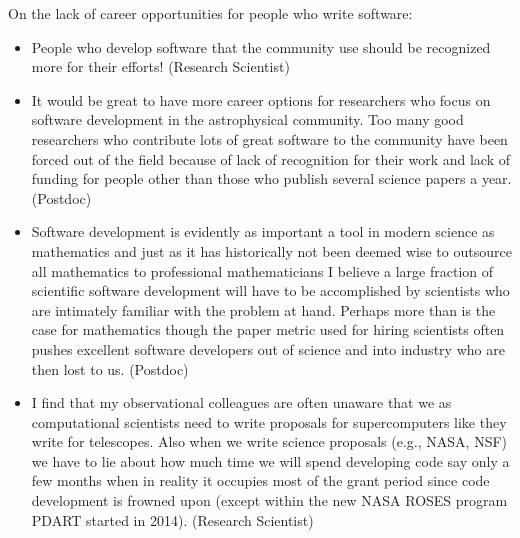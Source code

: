 \begin{appendix}
\begin{itemize}
\end{itemize}

On the lack of career opportunities for people who write software:

\begin{itemize}
\item{People who develop software that the community use should be recognized more for their efforts! (Research Scientist)}
\item{It would be great to have more career options for researchers who focus on software development in the astrophysical community.  Too many good researchers who contribute lots of great software to the community have been forced out of the field because of lack of recognition for their work and lack of funding for people other than those who publish several science papers a year. (Postdoc)}
\item{Software development is evidently as important a tool in modern science as mathematics and just as it has historically not been deemed wise to outsource all mathematics to professional mathematicians I believe a large fraction of scientific software development will have to be accomplished by scientists who are intimately familiar with the problem at hand. Perhaps more than is the case for mathematics though the paper metric used for hiring scientists often pushes excellent software developers out of science and into industry who are then lost to us. (Postdoc)}
\item{I find that my observational colleagues are often unaware that we as computational scientists need to write proposals for supercomputers like they write for telescopes.  Also when we write science proposals (e.g., NASA, NSF) we have to lie about how much time we will spend developing code say only a few months when in reality it occupies most of the grant period since code development is frowned upon (except within the new NASA ROSES program PDART started in 2014). (Research Scientist)}
\end{itemize}

\end{appendix}
  
  